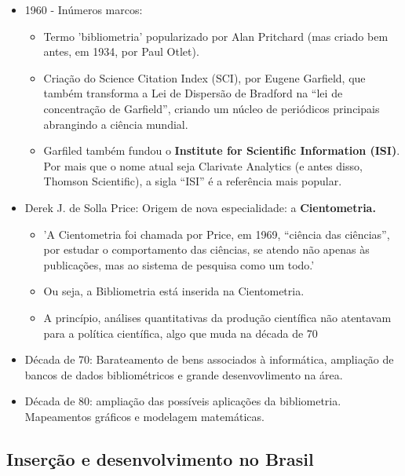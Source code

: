 \documentclass[11pt]{article}
\begin{document}
\begin{itemize}
\item 1960 - Inúmeros marcos:

\begin{itemize}
\item Termo 'bibliometria' popularizado por Alan Pritchard (mas criado bem antes, em 1934, por Paul Otlet).

\item Criação do Science Citation Index (SCI), por Eugene Garfield, que também transforma a Lei de Dispersão de Bradford na ``lei de concentração de Garfield'', criando um núcleo de periódicos principais abrangindo a ciência mundial.

\item Garfiled também fundou o \textbf{Institute for Scientific Information (ISI)}. Por mais que o nome atual seja Clarivate Analytics (e antes disso, Thomson Scientific), a sigla “ISI” é a referência mais popular.
\end{itemize}
\end{itemize}


\begin{itemize}
\item Derek J. de Solla Price: Origem de nova especialidade: a \textbf{Cientometria.}

\begin{itemize}
\item 'A Cientometria foi chamada por Price, em 1969, “ciência das ciências”, por estudar o comportamento das ciências, se atendo não apenas às publicações, mas ao sistema de pesquisa como um todo.'

\item Ou seja, a Bibliometria está inserida na Cientometria.

\item A princípio, análises quantitativas da produção científica não atentavam para a política científica, algo que muda na década de 70
\end{itemize}
\end{itemize}
\begin{itemize}
\item Década de 70: Barateamento de bens associados à informática, ampliação de bancos de dados bibliométricos e grande desenvovlimento na área.

\item Década de 80: ampliação das possíveis aplicações da bibliometria. Mapeamentos gráficos e modelagem matemáticas.
\end{itemize}

\subsection{Inserção e desenvolvimento no Brasil}
\label{sec:orgbefdc8f}
\end{document}
